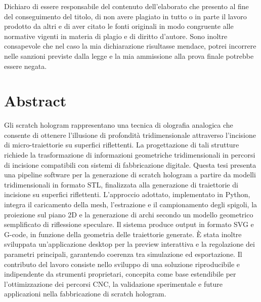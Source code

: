 \documentclass[a4paper,11pt,titlepage,twoside]{book}
\newcommand{\1}{\mathbf{1}}
\numberwithin{equation}{chapter}
\theoremstyle{plain}
\theoremstyle{definition}
\begin{document}
	\endgroup
	
	
	\clearpage
	\thispagestyle{empty}
	\null
	\clearpage
	
	\pagestyle{plain}
	\frontmatter
	
	
	\thispagestyle{empty}
	
	\vspace*{4cm}
	
	\begin{center}
		\begin{minipage}{0.8\textwidth}
			\small
			Dichiaro di essere responsabile del contenuto dell’elaborato che 
			presento al fine del conseguimento del titolo, di non avere plagiato in tutto o in parte il lavoro prodotto da altri e di aver citato
			le fonti originali in modo congruente alle normative vigenti in
			materia di plagio e di diritto d’autore. Sono inoltre consapevole
			che nel caso la mia dichiarazione risultasse mendace, potrei incorrere nelle sanzioni previste dalla legge e la mia ammissione
			alla prova finale potrebbe essere negata.
		\end{minipage}
	\end{center}
	
	\clearpage
	
	\thispagestyle{empty}
	\null
	\clearpage
	
	
	\thispagestyle{plain}
	
	\chapter*{Abstract}
	
	Gli scratch hologram rappresentano una tecnica di olografia analogica che consente di ottenere l’illusione di profondità tridimensionale attraverso l’incisione di micro-traiettorie su superfici riflettenti. La progettazione di tali strutture richiede la trasformazione di informazioni geometriche tridimensionali in percorsi di incisione compatibili con sistemi di fabbricazione digitale. Questa tesi presenta una pipeline software per la generazione di scratch hologram a partire da modelli tridimensionali in formato STL, finalizzata alla generazione di traiettorie di incisione su superfici riflettenti. L’approccio adottato, implementato in Python, integra il caricamento della mesh, l’estrazione e il campionamento degli spigoli, la proiezione sul piano 2D e la generazione di archi secondo un modello geometrico semplificato di riflessione speculare. Il sistema produce output in formato SVG e G-code, in funzione della geometria delle traiettorie generate. È stata inoltre sviluppata un’applicazione desktop per la preview interattiva e la regolazione dei parametri principali, garantendo coerenza tra simulazione ed esportazione. Il contributo del lavoro consiste nello sviluppo di una soluzione riproducibile e indipendente da strumenti proprietari, concepita come base estendibile per l’ottimizzazione dei percorsi CNC, la validazione sperimentale e future applicazioni nella fabbricazione di scratch hologram.
	
\end{document}
